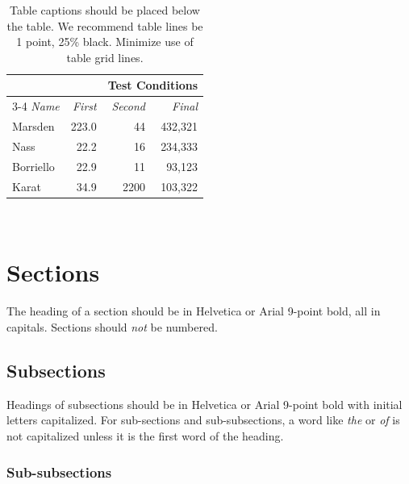 \documentclass{ciis}
\begin{document}

\begin{table}
  \centering
  \begin{tabular}{l r r r}
    & & \multicolumn{2}{c}{\small{\textbf{Test Conditions}}} \\
    \cmidrule(r){3-4}
    {\small\textit{Name}}
    & {\small \textit{First}}
      & {\small \textit{Second}}
    & {\small \textit{Final}} \\
    \midrule
    Marsden & 223.0 & 44 & 432,321 \\
    Nass & 22.2 & 16 & 234,333 \\
    Borriello & 22.9 & 11 & 93,123 \\
    Karat & 34.9 & 2200 & 103,322 \\
  \end{tabular}
  \caption{Table captions should be placed below the table. We
    recommend table lines be 1 point, 25\% black. Minimize use of
    table grid lines.}~\label{tab:table1}
\end{table}

\section{Sections}

The heading of a section should be in Helvetica or Arial 9-point bold,
all in capitals. Sections should \textit{not} be numbered.

\subsection{Subsections}

Headings of subsections should be in Helvetica or Arial 9-point bold
with initial letters capitalized.  For sub-sections and
sub-subsections, a word like \emph{the} or \emph{of} is not
capitalized unless it is the first word of the heading.

\subsubsection{Sub-subsections}
\end{document}
